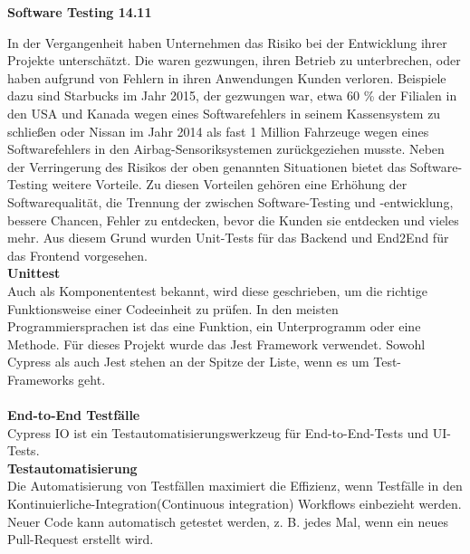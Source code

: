 \textbf{Software Testing 14.11}

In der Vergangenheit haben Unternehmen das Risiko bei der Entwicklung ihrer Projekte unterschätzt. 
Die waren gezwungen, ihren Betrieb zu unterbrechen, oder haben aufgrund von Fehlern in ihren Anwendungen Kunden verloren. Beispiele dazu sind Starbucks im Jahr 2015, der gezwungen war, etwa 60 \% der Filialen in den USA und Kanada wegen eines Softwarefehlers in seinem Kassensystem zu schließen{\cite{QS1}} oder Nissan im Jahr 2014 als fast 1 Million Fahrzeuge wegen eines Softwarefehlers in den Airbag-Sensoriksystemen zurückgeziehen musste{\cite{QS2}}. Neben der Verringerung des Risikos der oben genannten Situationen bietet das Software-Testing weitere Vorteile. Zu diesen Vorteilen gehören eine Erhöhung der Softwarequalität, die Trennung der zwischen Software-Testing und -entwicklung, bessere Chancen, Fehler zu entdecken, bevor die Kunden sie entdecken und vieles mehr. Aus diesem Grund wurden Unit-Tests für das Backend und End2End für das Frontend vorgesehen. 
\\
\textbf{Unittest}\\
Auch als Komponententest bekannt, wird diese geschrieben, um die richtige Funktionsweise einer Codeeinheit zu prüfen. In den meisten Programmiersprachen ist das eine Funktion, ein Unterprogramm oder eine Methode. Für dieses Projekt wurde das Jest Framework verwendet. 
Sowohl Cypress als auch Jest stehen an der Spitze der Liste, wenn es um Test-Frameworks geht{\cite{QS3}}.
\\\\
\textbf{End-to-End Testfälle}\\
Cypress IO ist ein Testautomatisierungswerkzeug für End-to-End-Tests und UI-Tests. 
\\
\textbf{Testautomatisierung}\\
Die Automatisierung von Testfällen maximiert die Effizienz, wenn Testfälle in den Kontinuierliche-Integration(Continuous integration) Workflows einbezieht werden. Neuer Code kann automatisch getestet werden, z. B. jedes Mal, wenn ein neues Pull-Request erstellt wird.

